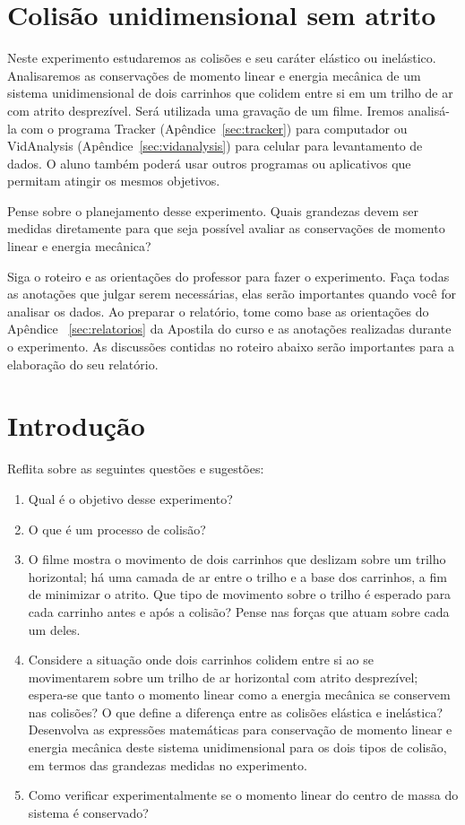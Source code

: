 \section{Colisão unidimensional sem atrito}

Neste experimento estudaremos as colisões e seu caráter elástico ou inelástico. Analisaremos as conservações de momento linear e energia mecânica de um sistema unidimensional de dois carrinhos que colidem entre si em um trilho de ar com atrito desprezível. Será utilizada uma gravação de um filme. Iremos analisá-la com o programa Tracker (Apêndice~\ref{sec:tracker}) para computador ou VidAnalysis (Apêndice~\ref{sec:vidanalysis}) para celular para levantamento de dados. O aluno também poderá usar outros programas ou aplicativos que permitam atingir os mesmos objetivos.

Pense sobre o planejamento desse experimento. Quais grandezas devem ser medidas diretamente para que seja possível avaliar as conservações de momento linear e energia mecânica? 

Siga o roteiro e as orientações do professor para fazer o experimento. Faça todas as anotações que julgar serem necessárias, elas serão importantes quando você for analisar os dados. Ao preparar o relatório,  tome como base as orientações do Apêndice ~\ref{sec:relatorios}  da Apostila do curso e as anotações realizadas durante o experimento. As discussões contidas no roteiro abaixo serão importantes para a elaboração do seu relatório.

\section{Introdução }

Reflita sobre as seguintes questões e sugestões:

\begin{enumerate}
\item Qual é o objetivo desse experimento?
\item O que é um processo de colisão?
\item O filme mostra o movimento de dois carrinhos que deslizam sobre um trilho horizontal; há uma camada de ar entre o trilho e a base dos carrinhos, a fim de minimizar o atrito. Que tipo de movimento sobre o trilho é esperado para cada carrinho  antes e após a colisão? Pense nas forças que atuam sobre cada um deles.
\item  Considere a situação onde dois carrinhos colidem entre si ao se movimentarem sobre um trilho de ar horizontal com atrito desprezível; espera-se que tanto o momento linear como a energia mecânica se conservem nas colisões? O que define a diferença entre as colisões elástica e inelástica? Desenvolva as expressões matemáticas para conservação de momento linear e energia mecânica deste sistema unidimensional para os dois tipos de colisão, em termos das grandezas medidas no experimento. 
\item Como verificar experimentalmente se o momento linear do centro de massa do sistema é conservado?
\end{enumerate}

